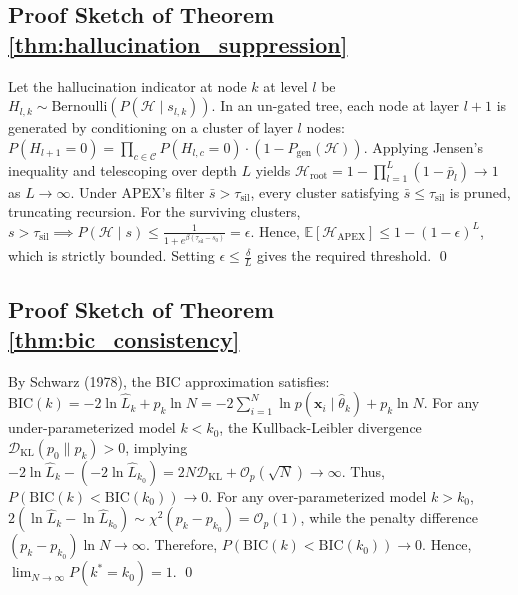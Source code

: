 \documentclass[11pt,a4paper]{article}
\begin{document}
\subsection*{Proof Sketch of Theorem \ref{thm:hallucination_suppression}}
Let the hallucination indicator at node $k$ at level $l$ be $H_{l,k} \sim \text{Bernoulli}(P(\mathcal{H} \mid s_{l,k}))$. In an un-gated tree, each node at layer $l+1$ is generated by conditioning on a cluster of layer $l$ nodes:
$P(H_{l+1} = 0) = \prod_{c \in \mathcal{C}} P(H_{l,c} = 0) \cdot (1 - P_{\text{gen}}(\mathcal{H}))$.
Applying Jensen's inequality and telescoping over depth $L$ yields $\mathcal{H}_{\text{root}} = 1 - \prod_{l=1}^L (1 - \bar{p}_l) \to 1$ as $L \to \infty$. Under APEX's filter $\bar{s} > \tau_{\text{sil}}$, every cluster satisfying $\bar{s} \le \tau_{\text{sil}}$ is pruned, truncating recursion. For the surviving clusters, $s > \tau_{\text{sil}} \implies P(\mathcal{H} \mid s) \le \frac{1}{1 + e^{\beta(\tau_{\text{sil}} - s_0)}} = \epsilon$. Hence, $\mathbb{E}[\mathcal{H}_{\text{APEX}}] \le 1 - (1 - \epsilon)^L$, which is strictly bounded. Setting $\epsilon \le \frac{\delta}{L}$ gives the required threshold. \qed

\subsection*{Proof Sketch of Theorem \ref{thm:bic_consistency}}
By Schwarz (1978), the BIC approximation satisfies:
$\text{BIC}(k) = -2 \ln \hat{L}_k + p_k \ln N = -2 \sum_{i=1}^N \ln p(\mathbf{x}_i \mid \hat{\theta}_k) + p_k \ln N$.
For any under-parameterized model $k < k_0$, the Kullback-Leibler divergence $\mathcal{D}_{\text{KL}}(p_0 \parallel p_k) > 0$, implying $-2 \ln \hat{L}_k - (-2 \ln \hat{L}_{k_0}) = 2 N \mathcal{D}_{\text{KL}} + \mathcal{O}_p(\sqrt{N}) \to \infty$. Thus, $P(\text{BIC}(k) < \text{BIC}(k_0)) \to 0$. For any over-parameterized model $k > k_0$, $2(\ln \hat{L}_k - \ln \hat{L}_{k_0}) \sim \chi^2(p_k - p_{k_0}) = \mathcal{O}_p(1)$, while the penalty difference $(p_k - p_{k_0}) \ln N \to \infty$. Therefore, $P(\text{BIC}(k) < \text{BIC}(k_0)) \to 0$. Hence, $\lim_{N \to \infty} P(k^* = k_0) = 1$. \qed
\end{document}
